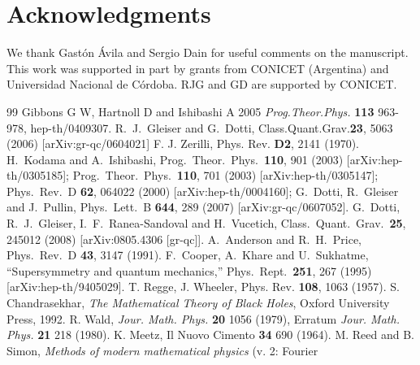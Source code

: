 \documentclass[aps,floats,showpacs,amssymb,tightenlines]{revtex4}
\begin{document}
\section*{Acknowledgments}

We thank Gast\'on \'Avila and Sergio Dain for useful comments on the manuscript.
This work was supported in part by grants from CONICET (Argentina)
and Universidad Nacional de C\'ordoba.  RJG and GD are supported by
CONICET.




\begin{thebibliography}{99}
 Gibbons G W, Hartnoll D and  Ishibashi A 2005 {\em Prog.Theor.Phys.}
{\bf 113} 963-978, hep-th/0409307.
R.~J.~Gleiser and G.~Dotti,
  Class.Quant.Grav.{\bf 23}, 5063 (2006) [arXiv:gr-qc/0604021]
 F. J.
Zerilli, Phys. Rev. {\bf D2}, 2141 (1970).
  H.~Kodama and A.~Ishibashi,
  Prog.\ Theor.\ Phys.\  {\bf 110}, 901 (2003)
  [arXiv:hep-th/0305185];
  Prog.\ Theor.\ Phys.\  {\bf 110}, 701 (2003)
  [arXiv:hep-th/0305147];
  Phys.\ Rev.\  D {\bf 62}, 064022 (2000)
  [arXiv:hep-th/0004160];
  G.~Dotti, R.~Gleiser and J.~Pullin,
  Phys.\ Lett.\  B {\bf 644}, 289 (2007)
  [arXiv:gr-qc/0607052].
  G.~Dotti, R.~J.~Gleiser, I.~F.~Ranea-Sandoval and H.~Vucetich,
  Class.\ Quant.\ Grav.\  {\bf 25}, 245012 (2008)
  [arXiv:0805.4306 [gr-qc]].
  A.~Anderson and R.~H.~Price,
  Phys.\ Rev.\  D {\bf 43}, 3147 (1991).
  F.~Cooper, A.~Khare and U.~Sukhatme,
  ``Supersymmetry and quantum mechanics,''
  Phys.\ Rept.\  {\bf 251}, 267 (1995)
  [arXiv:hep-th/9405029].
T. Regge, J. Wheeler, Phys. Rev. {\bf 108}, 1063 (1957).
 S. Chandrasekhar, {\em The Mathematical Theory of Black Holes}, Oxford University Press, 1992.
 R. Wald, {\em Jour. Math. Phys.} {\bf 20} 1056 (1979), Erratum
{\em Jour. Math. Phys.} {\bf 21} 218 (1980).
K. Meetz, Il Nuovo Cimento {\bf 34} 690 (1964).
   M. Reed and B. Simon, {\em  Methods of modern mathematical physics} (v. 2: Fourier

\end{thebibliography}
\end{document}
